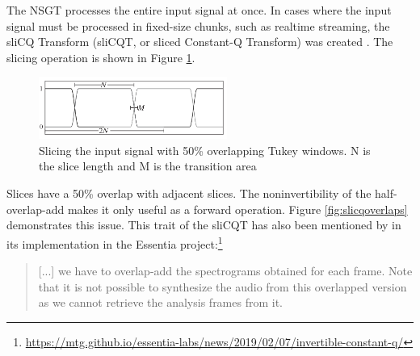 \documentclass[report.tex]{subfiles}
\begin{document}
The NSGT processes the entire input signal at once. In cases where the input signal must be processed in fixed-size chunks, such as realtime streaming, the sliCQ Transform (sliCQT, or sliced Constant-Q Transform) was created \parencite{invertiblecqt, slicq}. The slicing operation is shown in Figure \ref{fig:slicqtukeys}.

\begin{figure}[ht]
	\centering
	\includegraphics[width=0.55\textwidth]{./images-misc/slicq_windows.png}
	\caption{Slicing the input signal with 50\% overlapping Tukey windows. N is the slice length and M is the transition area \parencite{slicq}}
	\label{fig:slicqtukeys}
\end{figure}

Slices have a 50\% overlap with adjacent slices. The noninvertibility of the half-overlap-add makes it only useful as a forward operation. Figure \ref{fig:slicqoverlaps} demonstrates this issue. This trait of the sliCQT has also been mentioned by in its implementation in the Essentia project:\footnote{\url{https://mtg.github.io/essentia-labs/news/2019/02/07/invertible-constant-q/}}

\begin{quote}
	[...] we have to overlap-add the spectrograms obtained for each frame. Note that it is not possible to synthesize the audio from this overlapped version as we cannot retrieve the analysis frames from it.
\end{quote}
\end{document}
